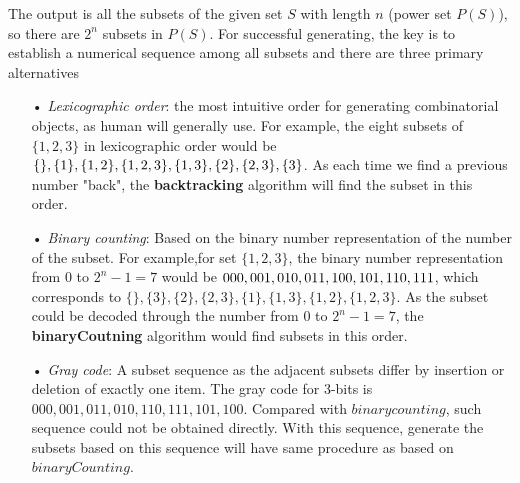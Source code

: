 \documentclass[catalog.tex]{subfiles}
\begin{document}
The output  is all the subsets of the given set $S$ with length $n$ (power set $P(S)$), so there are $2^n$ subsets in $P(S)$. For successful generating, the key is to establish a numerical sequence among all subsets and there are three primary alternatives \cite{1}
\begin{enumerate}
\item[•] \textit{Lexicographic order}: the most intuitive order for generating combinatorial objects, as human will generally use. For example, the eight subsets of $\{ 1, 2, 3\}$ in lexicographic order would be $\{ \}, \{1\}, \{1,2\}, \{1,2,3\}, \\ \{1,3\}, \{2\}, \{2,3\}, \{3\}$. As each time we find a previous number "back", the \textbf{backtracking} algorithm will find the subset in this order. 

\item[•] \textit{Binary counting}: Based on the binary number representation of the number of the subset. For example,for set $\{ 1, 2, 3\}$, the binary number representation from $0$ to $2^n-1 = 7$ would be $000, 001, 010, 011, 100, 101, 110,\\ 111$, which corresponds to $\{ \}, \{3\}, \{2\}, \{2,3\},  \{1\}, \{1,3\}, \{1,2\}, \{1,2,3\}$. As the subset could be decoded through the number from $0$ to $2^n-1 = 7$, the \textbf{binaryCoutning} algorithm would find subsets in this order. 

\item[•] \textit{Gray code}: A subset sequence as the adjacent subsets differ by insertion or deletion of exactly one item. The gray code for 3-bits is  $000, 001, 011, 010, 110, 111, 101, 100$. Compared with $binary counting$, such sequence could not be obtained directly. With this sequence, generate the subsets based on this sequence will have same procedure as based on $binaryCounting$. 
\end{enumerate}

\end{document}
